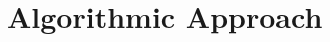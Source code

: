 \documentclass[../main.tex]{subfiles}
\begin{document}
\section{Algorithmic Approach}\label{sec:algorithm}
\end{document}
